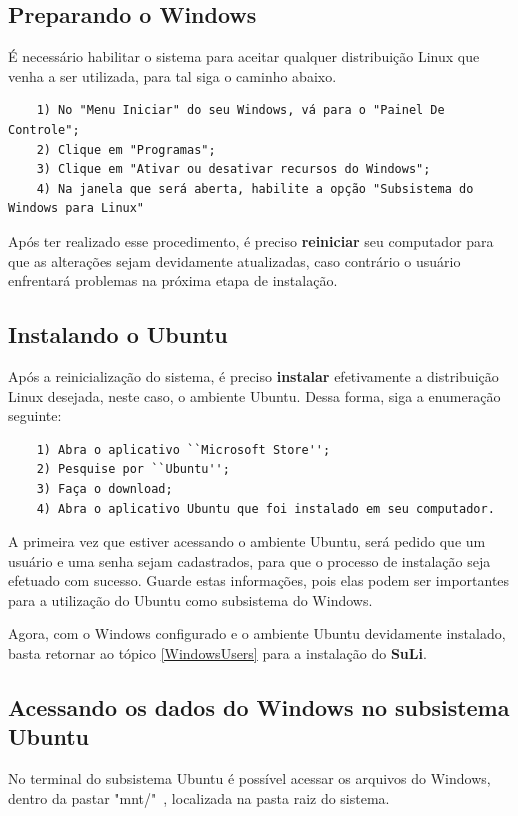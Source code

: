 \documentclass[12pt, a4paper]{article}
\newcommand{\SL}{{\bf SuLi}}
\begin{document}
\subsection{Preparando o Windows}
É necessário habilitar o sistema para aceitar qualquer distribuição Linux que venha a ser utilizada, para tal siga o caminho abaixo.

\begin{verbatim}
	1) No "Menu Iniciar" do seu Windows, vá para o "Painel De Controle";
	2) Clique em "Programas";
	3) Clique em "Ativar ou desativar recursos do Windows";
	4) Na janela que será aberta, habilite a opção "Subsistema do Windows para Linux"
\end{verbatim}
Após ter realizado esse procedimento, é preciso \textbf{reiniciar} seu computador para que as alterações sejam devidamente atualizadas, caso contrário o usuário enfrentará problemas na próxima etapa de instalação.



\subsection{Instalando o Ubuntu} Após a reinicialização do sistema, é preciso \textbf{instalar} efetivamente a distribuição Linux desejada, neste caso, o ambiente Ubuntu. Dessa forma, siga a enumeração seguinte:

\begin{verbatim}
	1) Abra o aplicativo ``Microsoft Store'';
	2) Pesquise por ``Ubuntu'';
	3) Faça o download;
	4) Abra o aplicativo Ubuntu que foi instalado em seu computador.
\end{verbatim}

A primeira vez que estiver acessando o ambiente Ubuntu, será pedido que um usuário e uma senha sejam cadastrados, para que o processo de instalação seja efetuado com sucesso. Guarde estas informações, pois elas podem ser importantes para a utilização do Ubuntu como subsistema do Windows.

Agora, com o Windows configurado e o ambiente Ubuntu devidamente instalado, basta retornar ao tópico \ref{WindowsUsers} para a instalação do \SL. 

\subsection{Acessando os dados do Windows no subsistema Ubuntu} No terminal  do subsistema Ubuntu é possível acessar os arquivos do Windows, dentro da pastar "mnt/"~, localizada na pasta raiz do sistema.
\end{document}
